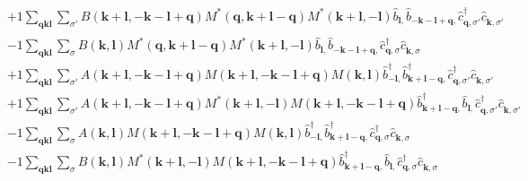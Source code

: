 \begin{align*}
	&+1 \sum_{ \mathbf{q} \mathbf{k} \mathbf{l} } \sum_{ \sigma' } B( \mathbf{k}+\mathbf{l}, -\mathbf{k}-\mathbf{l}+\mathbf{q} )  M^*( \mathbf{q}, \mathbf{k}+\mathbf{l}-\mathbf{q} )  M^*( \mathbf{k}+\mathbf{l}, -\mathbf{l} )   \hat{b}_{ \mathbf{l}, }^{\phantom{\dagger}} \hat{b}_{ -\mathbf{k}-\mathbf{l}+\mathbf{q}, }^{\phantom{\dagger}} \hat{c}_{ \mathbf{q}, \sigma' }^\dagger  \hat{c}_{ \mathbf{k}, \sigma' }^{\phantom{\dagger}}  \\
	&-1 \sum_{ \mathbf{q} \mathbf{k} \mathbf{l} } \sum_{ \sigma } B( \mathbf{k}, \mathbf{l} )  M^*( \mathbf{q}, \mathbf{k}+\mathbf{l}-\mathbf{q} )  M^*( \mathbf{k}+\mathbf{l}, -\mathbf{l} )   \hat{b}_{ \mathbf{l}, }^{\phantom{\dagger}} \hat{b}_{ -\mathbf{k}-\mathbf{l}+\mathbf{q}, }^{\phantom{\dagger}} \hat{c}_{ \mathbf{q}, \sigma }^\dagger  \hat{c}_{ \mathbf{k}, \sigma }^{\phantom{\dagger}}  \\
	&+1 \sum_{ \mathbf{q} \mathbf{k} \mathbf{l} } \sum_{ \sigma' } A( \mathbf{k}+\mathbf{l}, -\mathbf{k}-\mathbf{l}+\mathbf{q} )  M( \mathbf{k}+\mathbf{l}, -\mathbf{k}-\mathbf{l}+\mathbf{q} )  M( \mathbf{k}, \mathbf{l} )   \hat{b}_{ -\mathbf{l}, }^\dagger  \hat{b}_{ \mathbf{k}+\mathbf{l}-\mathbf{q}, }^\dagger  \hat{c}_{ \mathbf{q}, \sigma' }^\dagger  \hat{c}_{ \mathbf{k}, \sigma' }^{\phantom{\dagger}}  \\
	&+1 \sum_{ \mathbf{q} \mathbf{k} \mathbf{l} } \sum_{ \sigma' } A( \mathbf{k}+\mathbf{l}, -\mathbf{k}-\mathbf{l}+\mathbf{q} )  M^*( \mathbf{k}+\mathbf{l}, -\mathbf{l} )  M( \mathbf{k}+\mathbf{l}, -\mathbf{k}-\mathbf{l}+\mathbf{q} )   \hat{b}_{ \mathbf{k}+\mathbf{l}-\mathbf{q}, }^\dagger  \hat{b}_{ \mathbf{l}, }^{\phantom{\dagger}} \hat{c}_{ \mathbf{q}, \sigma' }^\dagger  \hat{c}_{ \mathbf{k}, \sigma' }^{\phantom{\dagger}}  \\
	&-1 \sum_{ \mathbf{q} \mathbf{k} \mathbf{l} } \sum_{ \sigma } A( \mathbf{k}, \mathbf{l} )  M( \mathbf{k}+\mathbf{l}, -\mathbf{k}-\mathbf{l}+\mathbf{q} )  M( \mathbf{k}, \mathbf{l} )   \hat{b}_{ -\mathbf{l}, }^\dagger  \hat{b}_{ \mathbf{k}+\mathbf{l}-\mathbf{q}, }^\dagger  \hat{c}_{ \mathbf{q}, \sigma }^\dagger  \hat{c}_{ \mathbf{k}, \sigma }^{\phantom{\dagger}}  \\
	&-1 \sum_{ \mathbf{q} \mathbf{k} \mathbf{l} } \sum_{ \sigma } B( \mathbf{k}, \mathbf{l} )  M^*( \mathbf{k}+\mathbf{l}, -\mathbf{l} )  M( \mathbf{k}+\mathbf{l}, -\mathbf{k}-\mathbf{l}+\mathbf{q} )   \hat{b}_{ \mathbf{k}+\mathbf{l}-\mathbf{q}, }^\dagger  \hat{b}_{ \mathbf{l}, }^{\phantom{\dagger}} \hat{c}_{ \mathbf{q}, \sigma }^\dagger  \hat{c}_{ \mathbf{k}, \sigma }^{\phantom{\dagger}}  \\

\end{align*}
